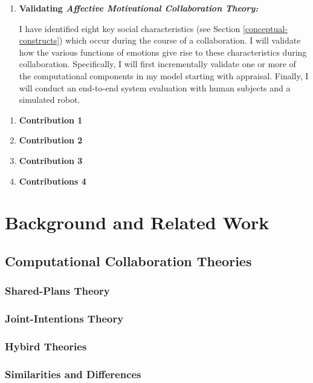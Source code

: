 \documentclass[12pt]{report}
\begin{document}
\begin{enumerate}
  \item \textbf{Validating \textit{Affective Motivational Collaboration
  Theory:}}

  I have identified eight key social characteristics (see Section
  \ref{conceptual-constructs}) which occur during the course of a collaboration.
  I will validate how the various functions of emotions give rise to these
  characteristics during collaboration. Specifically, I will first incrementally
  validate one or more of the computational components in my model starting with
  appraisal. Finally, I will conduct an end-to-end system evaluation with human
  subjects and a simulated robot.
  
\end{enumerate}

\begin{enumerate}
  \item \textbf{Contribution 1} 

  \item \textbf{Contribution 2} 

  \item \textbf{Contribution 3}

  \item \textbf{Contributions 4}
\end{enumerate}

\chapter{Background and Related Work}
\label{ch:background}

\section{Computational Collaboration Theories}

\subsection{Shared-Plans Theory}

\subsection{Joint-Intentions Theory}

\subsection{Hybird Theories}

\subsection{Similarities and Differences}
\end{document}
